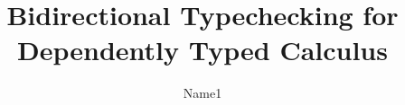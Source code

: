 \documentclass[a4paper,runningheads]{llncs}
\begin{document}
\setlength{\pdfpageheight}{\paperheight}
\setlength{\pdfpagewidth}{\paperwidth}

\title{Bidirectional Typechecking for Dependently Typed Calculus}
\author{Name1}
\maketitle








%


\appendix

\end{document}
